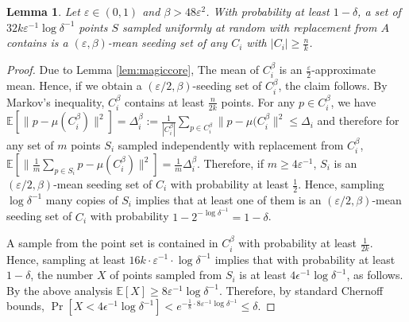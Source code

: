 \documentclass[11pt]{article}
\newtheorem{lemma}[theorem]{Lemma}
\newcommand{\eps}{\varepsilon}
\newcommand{\mdef}[1]{{\ensuremath{#1}}\xspace}  %
\newcommand{\E}[2][]{\mdef{\underset{#1}{\mathbb{E}}\left[#2\right]}} %
\newcommand{\yr}[1]{{\textcolor{blue}{#1}}{}}
\newcommand{\cs}[1]{{\textcolor{red}{#1}}{}}
\begin{document}
\begin{lemma}
\label{lem:uniform}
Let $\varepsilon\in (0,1)$ and $\beta > 48\varepsilon^2$.
With probability at least $1-\delta$, a set of $32 k\varepsilon^{-1}\log \delta^{-1}$ points $S$ sampled uniformly at random with replacement from $A$ contains is a $(\varepsilon,\beta)$-mean seeding set of any $C_i$ with $|C_i|\geq \frac{n}{k}$.
\end{lemma}
\begin{proof}
Due to Lemma \ref{lem:magiccore}, The mean of $C_i^{\beta}$ is an $\frac{\varepsilon}{2}$-approximate mean. Hence, if we obtain a $(\varepsilon/2,\beta)$-seeding set of $C_i^{\beta}$, the claim follows. By Markov's inequality, $C_i^{\beta}$ contains at least $\frac{n}{2k}$ points.
For any $p\in C_i^{\beta}$, we have $\mathbb{E}\left[\|p-\mu(C_i^{\beta})\|^2\right] = \Delta_i^{\beta} := \frac{1}{|C_i^{\beta}|}\sum_{p\in C_i^{\beta}}\|p-\mu(C_i^{\beta}\|^2\leq \Delta_i$ and therefore for any set of $m$ points $S_i$ sampled independently with replacement from $C_i^{\beta}$, $\mathbb{E}\left[\|\frac{1}{m}\sum_{p\in S_i} p-\mu(C_i^{\beta})\|^2\right] = \frac{1}{m}\Delta_i^{\beta}$. Therefore, if $m\geq 4\varepsilon^{-1}$, $S_i$ is an $(\varepsilon/2,\beta)$-mean seeding set of $C_i$ with probability at least $\frac 1 2$. Hence, sampling $\log\delta^{-1}$ many copies of $S_i$ implies that at least one of them is an $(\varepsilon/2,\beta)$-mean seeding set of $C_i$ with probability $1-2^{-\log \delta^{-1}} = 1-\delta$.

A sample from the point set is contained in $C_i^{\beta}$ with probability at least $\frac{1}{2k}$. Hence, sampling at least $16k\cdot \varepsilon^{-1}\cdot \log \delta^{-1}$ implies that with probability at least $1-\delta$, the number $X$ of points sampled from $S_i$ is
at least $4\epsilon^{-1}\log\delta^{-1}$, as follows. By the above analysis $\E X \ge 8\eps^{-1}\log\delta^{-1}$. Therefore, by standard
Chernoff bounds, $\Pr[X < 4\epsilon^{-1}\log\delta^{-1}] < e^{-\frac 1 8\cdot 8\eps^{-1}\log\delta^{-1}} \le \delta$. 
\end{proof}


\end{document}
